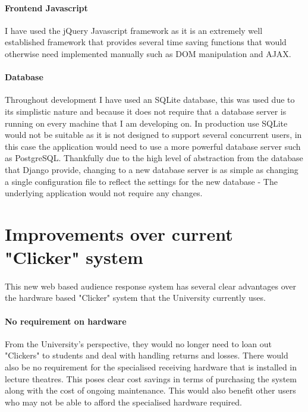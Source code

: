 \documentclass[10pt]{report}
\begin{document}
	\paragraph{Frontend Javascript}
	I have used the jQuery Javascript framework as it is an extremely well established framework that
	provides several time saving functions that would otherwise need implemented manually such as DOM
	manipulation and AJAX.
	
	\paragraph{Database}
	Throughout development I have used an SQLite database, this was used due to its simplistic nature and
	because it does not require that a database server is running on every machine that I am developing
	on.  In production use SQLite would not be suitable as it is not designed to support several
	concurrent users, in this case the application would need to use a more powerful database server such
	as PostgreSQL.  Thankfully due to the high level of abstraction from the database that Django provide,
	changing to a new database server is as simple as changing a single configuration file to reflect the
	settings for the new database - The underlying application would not require any changes.
	
	\section*{Improvements over current "Clicker" system}
	\paragraph{}
	This new web based audience response system has several clear advantages over the hardware based
	"Clicker" system that the University currently uses.
	
	\paragraph{No requirement on hardware}
	From the University's perspective, they would no longer need to loan out "Clickers" to students and
	deal with handling returns and losses.  There would also be no requirement for the specialised
	receiving hardware that is installed in lecture theatres.  This poses clear cost savings in terms of
	purchasing the system along with the cost of ongoing maintenance.  This would also benefit other users
	who may not be able to afford the specialised hardware required.
	
\end{document}

